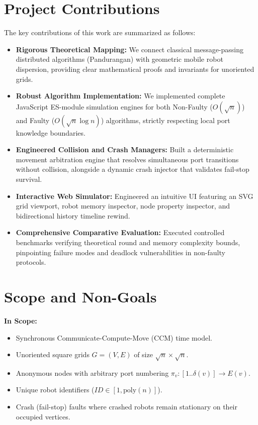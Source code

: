 \documentclass[11pt,a4paper]{report}
\begin{document}
\section{Project Contributions}
The key contributions of this work are summarized as follows:
\begin{itemize}
    \item \textbf{Rigorous Theoretical Mapping:} We connect classical message-passing distributed algorithms (Pandurangan) with geometric mobile robot dispersion, providing clear mathematical proofs and invariants for unoriented grids.
    \item \textbf{Robust Algorithm Implementation:} We implemented complete JavaScript ES-module simulation engines for both Non-Faulty ($O(\sqrt{n})$) and Faulty ($O(\sqrt{n}\log n)$) algorithms, strictly respecting local port knowledge boundaries.
    \item \textbf{Engineered Collision and Crash Managers:} Built a deterministic movement arbitration engine that resolves simultaneous port transitions without collision, alongside a dynamic crash injector that validates fail-stop survival.
    \item \textbf{Interactive Web Simulator:} Engineered an intuitive UI featuring an SVG grid viewport, robot memory inspector, node property inspector, and bidirectional history timeline rewind.
    \item \textbf{Comprehensive Comparative Evaluation:} Executed controlled benchmarks verifying theoretical round and memory complexity bounds, pinpointing failure modes and deadlock vulnerabilities in non-faulty protocols.
\end{itemize}

\section{Scope and Non-Goals}
\textbf{In Scope:}
\begin{itemize}
    \item Synchronous Communicate-Compute-Move (CCM) time model.
    \item Unoriented square grids $G = (V,E)$ of size $\sqrt{n} \times \sqrt{n}$.
    \item Anonymous nodes with arbitrary port numbering $\pi_v: [1..\delta(v)] \to E(v)$.
    \item Unique robot identifiers ($ID \in [1, \text{poly}(n)]$).
    \item Crash (fail-stop) faults where crashed robots remain stationary on their occupied vertices.
\end{itemize}
\end{document}
